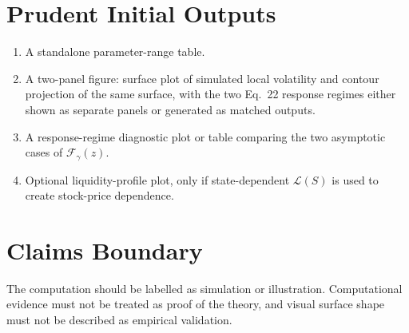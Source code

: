 \documentclass[11pt]{article}
\begin{document}
\section*{Prudent Initial Outputs}
\begin{enumerate}
  \item A standalone parameter-range table.
  \item A two-panel figure: surface plot of simulated local volatility and
  contour projection of the same surface, with the two Eq.~22 response
  regimes either shown as separate panels or generated as matched outputs.
  \item A response-regime diagnostic plot or table comparing the two
  asymptotic cases of \(\mathcal F_\gamma(z)\).
  \item Optional liquidity-profile plot, only if state-dependent
  \(\mathcal L(S)\) is used to create stock-price dependence.
\end{enumerate}

\section*{Claims Boundary}
The computation should be labelled as simulation or illustration.
Computational evidence must not be treated as proof of the theory, and
visual surface shape must not be described as empirical validation.
\end{document}
